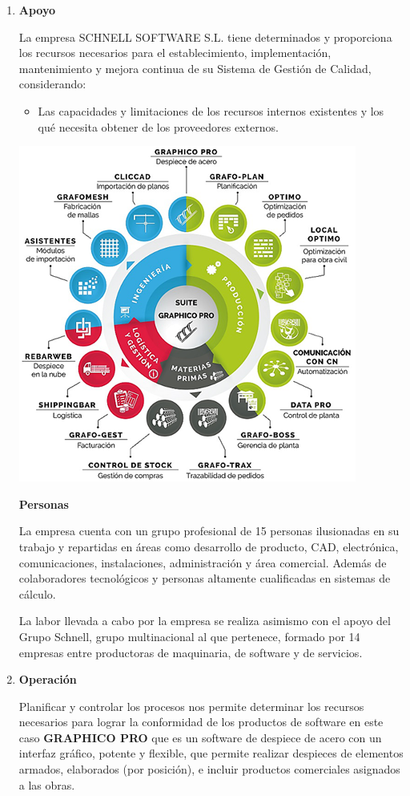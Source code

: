 \documentclass[10pt,a4paper]{article}
\begin{document}
\begin{enumerate}
\item \textbf{Apoyo}

La empresa SCHNELL SOFTWARE S.L. tiene determinados y proporciona los recursos necesarios para el establecimiento, implementación, mantenimiento y mejora continua de su Sistema de Gestión de Calidad, considerando:

\begin{itemize}
\item Las capacidades y limitaciones de los recursos internos existentes y los qué necesita obtener de los proveedores externos.
\end{itemize}

\includegraphics[scale=1]{GRAF-PRO.png}

\textbf{Personas}

La empresa cuenta con un grupo profesional de 15 personas ilusionadas en su trabajo y repartidas en áreas como desarrollo de producto, CAD, electrónica, comunicaciones, instalaciones, administración y área comercial. Además de colaboradores tecnológicos y personas altamente cualificadas en sistemas de cálculo.

La labor llevada a cabo por la empresa se realiza asimismo con el apoyo del Grupo Schnell, grupo multinacional al que pertenece, formado por 14 empresas entre productoras de maquinaria, de software y de servicios.

\item \textbf{Operación}

Planificar y controlar los procesos nos permite determinar los recursos necesarios para lograr la conformidad de los productos de software en este caso \textbf{GRAPHICO PRO} que es un software de despiece de acero con un interfaz gráfico, potente y flexible, que permite realizar despieces de elementos armados, elaborados (por posición), e incluir productos comerciales asignados a las obras.


\end{enumerate}
\end{document}
